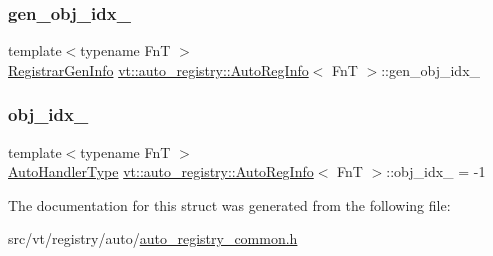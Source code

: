 \mbox{\label{structvt_1_1auto__registry_1_1_auto_reg_info_a5803e0771ae948d91d73a4721fc01fcb}} 
\subsubsection{\texorpdfstring{gen\+\_\+obj\+\_\+idx\+\_\+}{gen\_obj\_idx\_}}
{\footnotesize\ttfamily template$<$typename FnT $>$ \\
\hyperlink{structvt_1_1auto__registry_1_1_registrar_gen_info}{Registrar\+Gen\+Info} \hyperlink{structvt_1_1auto__registry_1_1_auto_reg_info}{vt\+::auto\+\_\+registry\+::\+Auto\+Reg\+Info}$<$ FnT $>$\+::gen\+\_\+obj\+\_\+idx\+\_\+}

\mbox{\label{structvt_1_1auto__registry_1_1_auto_reg_info_ab44c4c795cdffbc56e6e65ffab728013}} 
\subsubsection{\texorpdfstring{obj\+\_\+idx\+\_\+}{obj\_idx\_}}
{\footnotesize\ttfamily template$<$typename FnT $>$ \\
\hyperlink{namespacevt_1_1auto__registry_ae295e18699146815bb7d7674594d95d7}{Auto\+Handler\+Type} \hyperlink{structvt_1_1auto__registry_1_1_auto_reg_info}{vt\+::auto\+\_\+registry\+::\+Auto\+Reg\+Info}$<$ FnT $>$\+::obj\+\_\+idx\+\_\+ = -\/1}



The documentation for this struct was generated from the following file\+:\begin{DoxyCompactItemize}
\item 
src/vt/registry/auto/\hyperlink{auto__registry__common_8h}{auto\+\_\+registry\+\_\+common.\+h}\end{DoxyCompactItemize}
